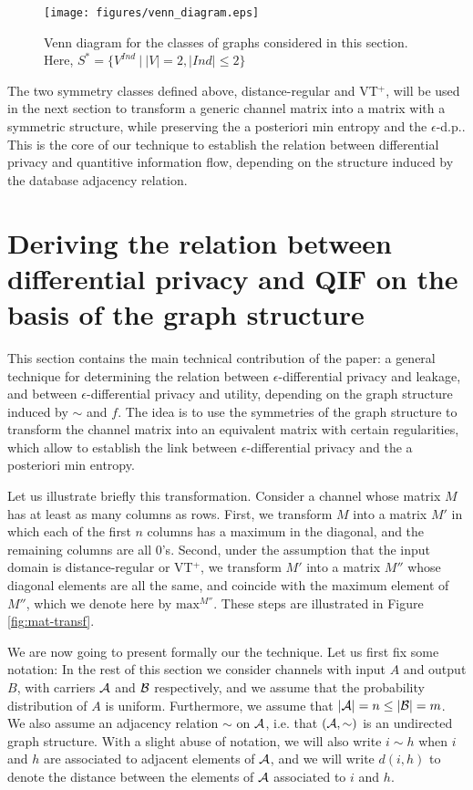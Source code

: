 \documentclass{llncs}
\begin{document}
\begin{figure}[t]\centering
		\texttt{[image: figures/venn\_diagram.eps]}\caption{Venn diagram for the classes of graphs considered in this section. Here, $S^* = \{V^{Ind} \ | \ |V| =  2, |Ind| \leq 2 \}$}\label{fig:venn}\end{figure}

The  two symmetry classes defined above, distance-regular and VT$^+$,  will be used in the next section to transform a generic channel matrix into a matrix with a symmetric structure, while preserving the a posteriori min entropy and the $\epsilon$-d.p.. This is the core of our technique to establish the relation between differential privacy and quantitive information flow, depending on the structure induced by the database adjacency relation. 


\section{Deriving the relation between differential privacy and QIF on the basis of the graph structure}

This section contains  the main technical contribution of the paper: a general technique for determining the relation  between $\epsilon$-differential privacy and leakage, and between  $\epsilon$-differential privacy and utility, depending on the graph structure induced by $\sim$ and $f$. 
The idea is to use the symmetries of the graph structure to  transform the channel matrix into an equivalent  matrix with certain regularities, which allow to establish the link between $\epsilon$-differential privacy and  the a posteriori min entropy. 

Let us illustrate briefly this transformation. Consider a channel whose matrix $M$ has at least as many columns as rows.   First, we transform $M$ into a matrix $M'$ in which each of the first $n$ columns has a maximum  in the diagonal, and the remaining columns are all $0$'s. 
Second, under the assumption that the input domain  is distance-regular or VT$^+$, we transform $M'$ into a matrix $M''$ whose diagonal elements are all the same, and coincide with the maximum element of $M''$, which we  denote here by $\text{max}^{M''}$. 
These steps are illustrated in Figure \ref{fig:mat-transf}.

We are now going to present formally our the technique. Let us first fix some notation: In the rest of this section  we consider channels with input  $A$ and output  $B$, with carriers $\cal A$ and $\cal B$ respectively, and we assume that the probability distribution of $A$ is uniform. Furthermore, we assume that $|{\cal A}| = n \leq |{\cal B}| = m$.
We also assume  an adjacency relation $\sim$ on  $\cal A$, i.e.  that $({\cal A}, \sim)$ is an undirected  graph structure. With a slight abuse of notation, we will also write $i\sim h$ when $i$ and $h$ are associated to adjacent elements of $\cal A$, and we will write $d(i,h)$ to denote the distance between the elements of $\cal A$ associated to $i$ and $h$. 
\end{document}
